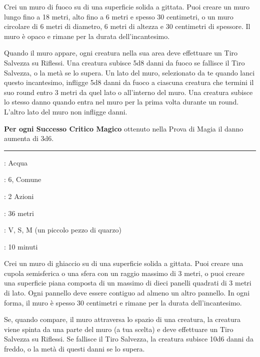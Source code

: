\begin{multicols}{2}
Crei un muro di fuoco su di una superficie solida a gittata. Puoi creare un muro lungo fino a 18 metri, alto fino a 6 metri e spesso 30 centimetri, o un muro circolare di 6 metri di diametro, 6 metri di altezza e 30 centimetri di spessore. Il muro è opaco e rimane per la durata dell'incantesimo.

Quando il muro appare, ogni creatura nella sua area deve effettuare un Tiro Salvezza su Riflessi. Una creatura subisce 5d8 danni da fuoco se fallisce il Tiro Salvezza, o la metà se lo supera. Un lato del muro, selezionato da te quando lanci questo incantesimo, infligge 5d8 danni da fuoco a ciascuna creatura che termini il suo round entro 3 metri da quel lato o all'interno del muro. Una creatura subisce lo stesso danno quando entra nel muro per la prima volta durante un round. L'altro lato del muro non infligge danni.

\textbf{Per ogni Successo Critico Magico} ottenuto nella Prova di Magia il danno aumenta di 3d6.

\smallskip\noindent\rule{\linewidth}{2pt} \hypertarget{Muro di Ghiaccio}{}\smallskip{}
\noindent
\begin{description}[noitemsep, topsep=0pt, parsep=0pt, partopsep=0pt, leftmargin=0cm, labelwidth=2.8cm]
	\item[\textbf{Lista di Magia}]: Acqua
	\item[\textbf{Livello}]: 6, Comune
	\item[\textbf{T. di Lancio}]: 2 Azioni
	\item[\textbf{Gittata}]: 36 metri
	\item[\textbf{Componenti}]: V, S, M (un piccolo pezzo di quarzo)
	\item[\textbf{Durata}]: 10 minuti
\end{description}

Crei un muro di ghiaccio su di una superficie solida a gittata. Puoi creare una cupola semisferica o una sfera con un raggio massimo di 3 metri, o puoi creare una superficie piana composta di un massimo di dieci panelli quadrati di 3 metri di lato. Ogni pannello deve essere contiguo ad almeno un altro pannello. In ogni forma, il muro è spesso 30 centimetri e rimane per la durata dell'incantesimo.

Se, quando compare, il muro attraversa lo spazio di una creatura, la creatura viene spinta da una parte del muro (a tua scelta) e deve effettuare un Tiro Salvezza su Riflessi. Se fallisce il Tiro Salvezza, la creatura subisce 10d6 danni da freddo, o la metà di questi danni se lo supera.


\end{multicols}
